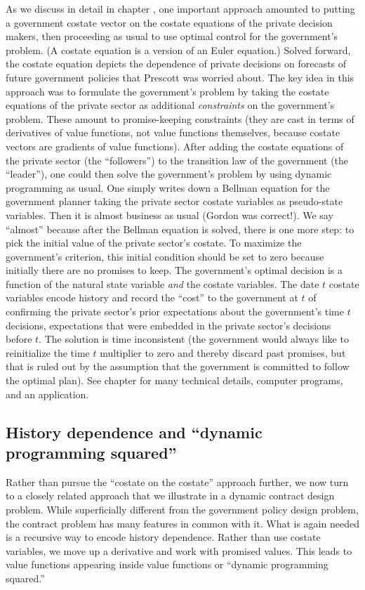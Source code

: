 As we discuss in detail in chapter ,
one important approach   amounted to putting a government  costate vector
on the costate  equations of the private decision makers,
then proceeding as usual to use optimal control for the government's
problem.
(A costate equation
is a version of an Euler equation.)
 Solved forward, the costate equation
depicts the dependence of private  decisions on forecasts
of future government policies that Prescott was worried about.
The key idea in this approach  was to formulate
the government's problem by taking the costate
equations of the private sector as additional {\it constraints\/}
on the government's problem. These  amount to promise-keeping
constraints (they are cast in terms of derivatives of value functions,
 not value functions themselves, because costate vectors are
gradients of value functions). After adding the  costate equations
of the  private sector (the ``followers'') to the transition
law of the government (the  ``leader''), one could then solve
the government's problem by using dynamic programming as usual.
One simply writes down a Bellman equation for the  government
planner taking the private sector costate variables as
pseudo-state variables. Then it is   almost business as
usual (Gordon was correct!). We say ``almost'' because     after the
Bellman equation is solved, there is one more step: to pick the
initial value of the private sector's costate.  To maximize the government's
criterion, this initial
condition should be set to  zero because initially there are no
promises to keep. The government's optimal decision   is a
function of the natural state variable {\it and\/} the costate
variables.
   The date $t$
 costate variables encode history and record the ``cost'' to the
government at $t$ of confirming the   private sector's  prior expectations
about the government's time $t$ decisions, expectations
that were embedded in the private sector's  decisions before $t$.
The solution is time inconsistent (the government would  always like to
reinitialize the time $t$ multiplier to zero and thereby discard
past promises, but that is ruled out by the assumption that the
government is committed to follow the optimal plan).
See chapter  for  many technical details, computer programs,
 and an application.

\subsection{History dependence and ``dynamic programming squared''}
 Rather than pursue the ``costate on the costate'' approach further,
we now turn  to a closely related approach that we illustrate in a
dynamic contract design problem. While superficially
different from the government policy design problem, the contract problem
  has
many features in common with it.   What is again needed is a recursive way
to encode history dependence.   Rather than use costate variables,
we move up a derivative and work with promised values. This leads
to value functions appearing inside value functions or
``dynamic programming squared.''

